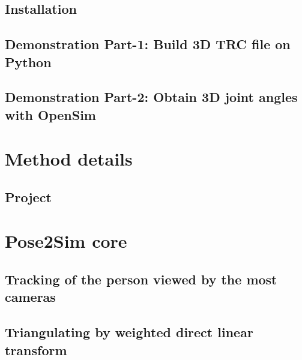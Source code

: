 \subsection{Installation}

\subsection{Demonstration Part-1: Build 3D TRC file on Python}

\subsection{Demonstration Part-2: Obtain 3D joint angles with OpenSim}



\section{Method details}

\subsection{Project}





\section{Pose2Sim core}
\subsection{Tracking of the person viewed by the most cameras}
\blindtext

\subsection{Triangulating by weighted direct linear transform}


